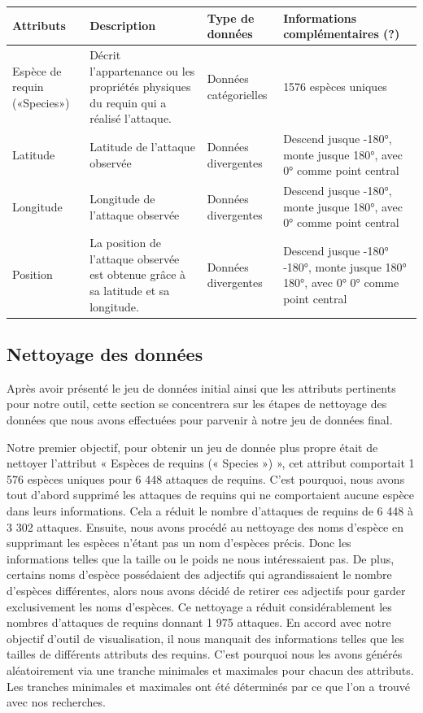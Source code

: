 \documentclass{article}
\begin{document}
\begin{table}[h]
\centering
\begin{tabular}{|m{1.9cm}|m{4cm}|m{3.3cm}|m{3.5cm}|}
\hline
Attributs & Description & Type de données & Informations complémentaires (?) \\ \hline
Espèce de requin («Species») & Décrit l’appartenance ou les propriétés physiques du requin qui a réalisé l’attaque. & Données catégorielles & 1576 espèces uniques \\ \hline
Latitude & Latitude de l’attaque observée & Données divergentes & Descend jusque \ang{-180}, monte jusque \ang{180}, avec \ang{0} comme point central \\ \hline
Longitude & Longitude de l’attaque observée & Données divergentes & Descend jusque \ang{-180}, monte jusque \ang{180}, avec \ang{0} comme point central \\ \hline
Position & La position de l’attaque observée est obtenue grâce à sa latitude et sa longitude. & Données divergentes & Descend jusque \ang{-180} \ang{-180}, monte jusque \ang{180} \ang{180}, avec \ang{0} \ang{0} comme point central \\ \hline
\end{tabular}
\end{table}

\clearpage
\subsection{Nettoyage des données}
Après avoir présenté le jeu de données initial ainsi que les attributs pertinents pour notre outil, cette section se concentrera sur les étapes de nettoyage des données que nous avons effectuées pour parvenir à notre jeu de données final.

Notre premier objectif, pour obtenir un jeu de donnée plus propre était de nettoyer l’attribut « Espèces de requins (« Species ») », cet attribut comportait 1 576 espèces uniques pour 6 448 attaques de requins. 
C’est pourquoi, nous avons tout d’abord supprimé les attaques de requins qui ne comportaient aucune espèce dans leurs informations. Cela a réduit le nombre d’attaques de requins de 6 448 à 3 302 attaques. 
Ensuite, nous avons procédé au nettoyage des noms d’espèce en supprimant les espèces n’étant pas un nom d’espèces précis. Donc les informations telles que la taille ou le poids ne nous intéressaient pas. 
De plus, certains noms d’espèce possédaient des adjectifs qui agrandissaient le nombre d’espèces différentes, alors nous avons décidé de retirer ces adjectifs pour garder exclusivement les noms d’espèces. 
Ce nettoyage a réduit considérablement les nombres d’attaques de requins donnant 1 975 attaques.
En accord avec notre objectif d’outil de visualisation, il nous manquait des informations telles que les tailles de différents attributs des requins. C’est pourquoi nous les avons générés aléatoirement via une tranche minimales et maximales pour chacun des attributs. Les tranches minimales et maximales ont été déterminés par ce que l'on a trouvé avec nos recherches.
\end{document}
